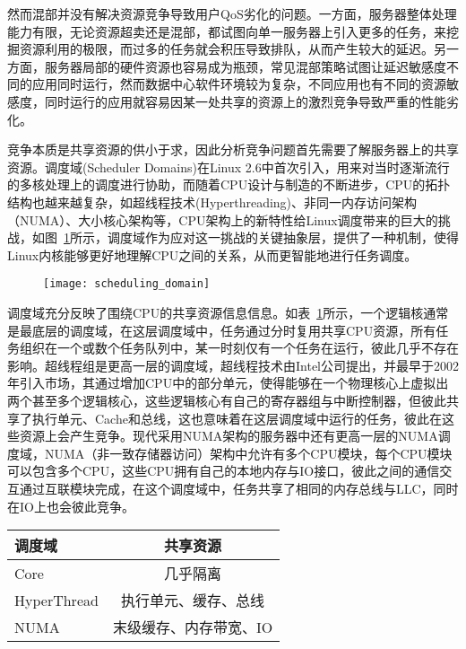 然而混部并没有解决资源竞争导致用户QoS劣化的问题。一方面，服务器整体处理能力有限，无论资源超卖还是混部，都试图向单一服务器上引入更多的任务，来挖掘资源利用的极限，而过多的任务就会积压导致排队，从而产生较大的延迟。另一方面，服务器局部的硬件资源也容易成为瓶颈，常见混部策略试图让延迟敏感度不同的应用同时运行，然而数据中心软件环境较为复杂，不同应用也有不同的资源敏感度，同时运行的应用就容易因某一处共享的资源上的激烈竞争导致严重的性能劣化。

竞争本质是共享资源的供小于求，因此分析竞争问题首先需要了解服务器上的共享资源。调度域(Scheduler Domains)\citep{schedulerdomains}在Linux 2.6中首次引入，用来对当时逐渐流行的多核处理上的调度进行协助，而随着CPU设计与制造的不断进步，CPU的拓扑结构也越来越复杂，如超线程技术(Hyperthreading)、非同一内存访问架构（NUMA）、大小核心架构等，CPU架构上的新特性给Linux调度带来的巨大的挑战，如图~\ref{fig:scheduling_domain}所示，调度域作为应对这一挑战的关键抽象层，提供了一种机制，使得Linux内核能够更好地理解CPU之间的关系，从而更智能地进行任务调度。

\begin{figure}[!htbp]
    \centering
    \texttt{[image: scheduling\_domain]}
    \label{fig:scheduling_domain}
\end{figure}

调度域充分反映了围绕CPU的共享资源信息信息。如表~\ref{tab:resourcesharing}所示，一个逻辑核通常是最底层的调度域，在这层调度域中，任务通过分时复用共享CPU资源，所有任务组织在一个或数个任务队列中，某一时刻仅有一个任务在运行，彼此几乎不存在影响。超线程组是更高一层的调度域，超线程技术由Intel公司提出，并最早于2002年引入市场，其通过增加CPU中的部分单元，使得能够在一个物理核心上虚拟出两个甚至多个逻辑核心，这些逻辑核心有自己的寄存器组与中断控制器，但彼此共享了执行单元、Cache和总线，这也意味着在这层调度域中运行的任务，彼此在这些资源上会产生竞争。现代采用NUMA架构的服务器中还有更高一层的NUMA调度域，NUMA（非一致存储器访问）架构中允许有多个CPU模块，每个CPU模块可以包含多个CPU，这些CPU拥有自己的本地内存与IO接口，彼此之间的通信交互通过互联模块完成，在这个调度域中，任务共享了相同的内存总线与LLC，同时在IO上也会彼此竞争。

\begin{table}
    \label{tab:resourcesharing}
    \footnotesize%
    \setlength{\tabcolsep}{4pt}%
    \renewcommand{\arraystretch}{1.5}%
    \centering
    \begin{tabular}{lc}
        \hline
        调度域 & 共享资源\\
        \hline
        Core & 几乎隔离\\
        HyperThread & 执行单元、缓存、总线\\
        NUMA & 末级缓存、内存带宽、IO\\
        \hline
    \end{tabular}
\end{table}

